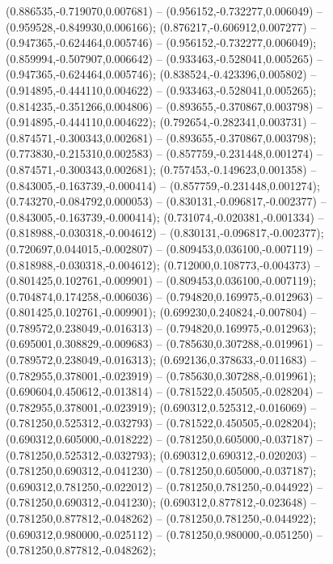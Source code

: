  (0.886535,-0.719070,0.007681) -- (0.956152,-0.732277,0.006049) -- (0.959528,-0.849930,0.006166);
 (0.876217,-0.606912,0.007277) -- (0.947365,-0.624464,0.005746) -- (0.956152,-0.732277,0.006049);
 (0.859994,-0.507907,0.006642) -- (0.933463,-0.528041,0.005265) -- (0.947365,-0.624464,0.005746);
 (0.838524,-0.423396,0.005802) -- (0.914895,-0.444110,0.004622) -- (0.933463,-0.528041,0.005265);
 (0.814235,-0.351266,0.004806) -- (0.893655,-0.370867,0.003798) -- (0.914895,-0.444110,0.004622);
 (0.792654,-0.282341,0.003731) -- (0.874571,-0.300343,0.002681) -- (0.893655,-0.370867,0.003798);
 (0.773830,-0.215310,0.002583) -- (0.857759,-0.231448,0.001274) -- (0.874571,-0.300343,0.002681);
 (0.757453,-0.149623,0.001358) -- (0.843005,-0.163739,-0.000414) -- (0.857759,-0.231448,0.001274);
 (0.743270,-0.084792,0.000053) -- (0.830131,-0.096817,-0.002377) -- (0.843005,-0.163739,-0.000414);
 (0.731074,-0.020381,-0.001334) -- (0.818988,-0.030318,-0.004612) -- (0.830131,-0.096817,-0.002377);
 (0.720697,0.044015,-0.002807) -- (0.809453,0.036100,-0.007119) -- (0.818988,-0.030318,-0.004612);
 (0.712000,0.108773,-0.004373) -- (0.801425,0.102761,-0.009901) -- (0.809453,0.036100,-0.007119);
 (0.704874,0.174258,-0.006036) -- (0.794820,0.169975,-0.012963) -- (0.801425,0.102761,-0.009901);
 (0.699230,0.240824,-0.007804) -- (0.789572,0.238049,-0.016313) -- (0.794820,0.169975,-0.012963);
 (0.695001,0.308829,-0.009683) -- (0.785630,0.307288,-0.019961) -- (0.789572,0.238049,-0.016313);
 (0.692136,0.378633,-0.011683) -- (0.782955,0.378001,-0.023919) -- (0.785630,0.307288,-0.019961);
 (0.690604,0.450612,-0.013814) -- (0.781522,0.450505,-0.028204) -- (0.782955,0.378001,-0.023919);
 (0.690312,0.525312,-0.016069) -- (0.781250,0.525312,-0.032793) -- (0.781522,0.450505,-0.028204);
 (0.690312,0.605000,-0.018222) -- (0.781250,0.605000,-0.037187) -- (0.781250,0.525312,-0.032793);
 (0.690312,0.690312,-0.020203) -- (0.781250,0.690312,-0.041230) -- (0.781250,0.605000,-0.037187);
 (0.690312,0.781250,-0.022012) -- (0.781250,0.781250,-0.044922) -- (0.781250,0.690312,-0.041230);
 (0.690312,0.877812,-0.023648) -- (0.781250,0.877812,-0.048262) -- (0.781250,0.781250,-0.044922);
 (0.690312,0.980000,-0.025112) -- (0.781250,0.980000,-0.051250) -- (0.781250,0.877812,-0.048262);
